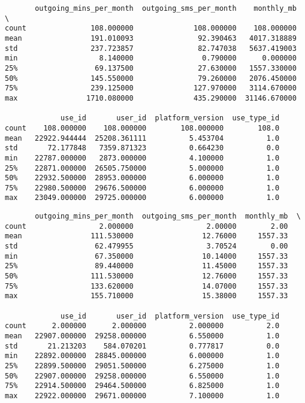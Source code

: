 \documentclass[11pt]{article}
\begin{document}
    
    \begin{verbatim}
       outgoing_mins_per_month  outgoing_sms_per_month    monthly_mb  \
count               108.000000              108.000000    108.000000   
mean                191.010093               92.390463   4017.318889   
std                 237.723857               82.747038   5637.419003   
min                   8.140000                0.790000      0.000000   
25%                  69.137500               27.630000   1557.330000   
50%                 145.550000               79.260000   2076.450000   
75%                 239.125000              127.970000   3114.670000   
max                1710.080000              435.290000  31146.670000   

             use_id       user_id  platform_version  use_type_id  
count    108.000000    108.000000        108.000000        108.0  
mean   22922.944444  25208.361111          5.453704          1.0  
std       72.177848   7359.871323          0.664230          0.0  
min    22787.000000   2873.000000          4.100000          1.0  
25%    22871.000000  26505.750000          5.000000          1.0  
50%    22932.500000  28953.000000          6.000000          1.0  
75%    22980.500000  29676.500000          6.000000          1.0  
max    23049.000000  29725.000000          6.000000          1.0  
    \end{verbatim}

    
    
    \begin{verbatim}
       outgoing_mins_per_month  outgoing_sms_per_month  monthly_mb  \
count                 2.000000                 2.00000        2.00   
mean                111.530000                12.76000     1557.33   
std                  62.479955                 3.70524        0.00   
min                  67.350000                10.14000     1557.33   
25%                  89.440000                11.45000     1557.33   
50%                 111.530000                12.76000     1557.33   
75%                 133.620000                14.07000     1557.33   
max                 155.710000                15.38000     1557.33   

             use_id       user_id  platform_version  use_type_id  
count      2.000000      2.000000          2.000000          2.0  
mean   22907.000000  29258.000000          6.550000          1.0  
std       21.213203    584.070201          0.777817          0.0  
min    22892.000000  28845.000000          6.000000          1.0  
25%    22899.500000  29051.500000          6.275000          1.0  
50%    22907.000000  29258.000000          6.550000          1.0  
75%    22914.500000  29464.500000          6.825000          1.0  
max    22922.000000  29671.000000          7.100000          1.0  
    \end{verbatim}
\end{document}
